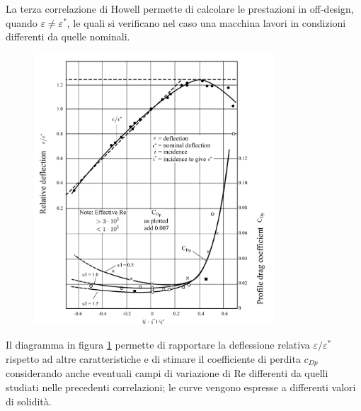 La terza correlazione di Howell permette di calcolare le prestazioni in off-design, quando $\varepsilon \neq \varepsilon^*$, le quali si verificano nel caso una macchina lavori in condizioni differenti da quelle nominali.
\begin{figure}[h!]
\centering
  \includegraphics[width=0.8\textwidth]{fig/FuoriProg1.pdf}
\caption{}
\label{fig:FuoriProg1}
\end{figure}
Il diagramma in figura \ref{fig:FuoriProg1} permette di rapportare la deflessione relativa $\varepsilon/\varepsilon^*$ rispetto ad altre caratteristiche e di stimare il coefficiente di perdita $c_{Dp}$ considerando anche eventuali campi di variazione di Re differenti da quelli studiati nelle precedenti correlazioni; le curve vengono espresse a differenti valori di solidità.

